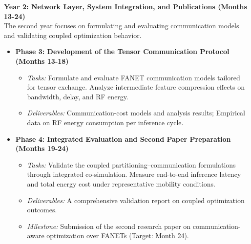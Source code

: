 \textbf{Year 2: Network Layer, System Integration, and Publications (Months 13-24)} \\
The second year focuses on formulating and evaluating communication models and validating coupled optimization behavior.
\begin{itemize}
  \item \textbf{Phase 3: Development of the Tensor Communication Protocol (Months 13-18)}
    \begin{itemize}
      \item \textit{Tasks:} Formulate and evaluate FANET communication models tailored for tensor exchange. Analyze intermediate feature compression effects on bandwidth, delay, and RF energy.
      \item \textit{Deliverables:} Communication-cost models and analysis results; Empirical data on RF energy consumption per inference cycle.
    \end{itemize}
  \item \textbf{Phase 4: Integrated Evaluation and Second Paper Preparation (Months 19-24)}
    \begin{itemize}
      \item \textit{Tasks:} Validate the coupled partitioning--communication formulations through integrated co-simulation. Measure end-to-end inference latency and total energy cost under representative mobility conditions.
      \item \textit{Deliverables:} A comprehensive validation report on coupled optimization outcomes.
      \item \textit{Milestone:} Submission of the second research paper on communication-aware optimization over FANETs (Target: Month 24).
    \end{itemize}
\end{itemize}

